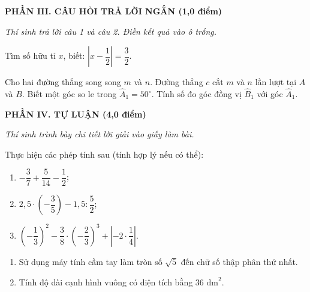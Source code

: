 \documentclass[12pt,a4paper]{article}
\begin{document}
\setcounter{ex}{0}
\noindent\textbf{\large PHẦN III. CÂU HỎI TRẢ LỜI NGẮN (1,0 điểm)}

\textit{Thí sinh trả lời câu 1 và câu 2. Điền kết quả vào ô trống.}

\vspace{1mm}
\begin{ex}
Tìm số hữu tỉ $x$, biết: $\left|x - \dfrac{1}{2}\right| = \dfrac{3}{2}$. 
\end{ex}

\begin{ex}
Cho hai đường thẳng song song $m$ và $n$. Đường thẳng $c$ cắt $m$ và $n$ lần lượt tại $A$ và $B$. Biết một góc so le trong $\widehat{A}_1 = 50^\circ$. Tính số đo góc đồng vị $\widehat{B}_1$ với góc $\widehat{A}_1$. 
\end{ex}


\newpage
\setcounter{ex}{0}
\noindent\textbf{\large PHẦN IV. TỰ LUẬN (4,0 điểm)}

\textit{Thí sinh trình bày chi tiết lời giải vào giấy làm bài.}

\vspace{1mm}
\begin{ex}
Thực hiện các phép tính sau (tính hợp lý nếu có thể):
\begin{enumerate}[label=\textbf{\alph*)}, leftmargin=0.8cm, itemsep=1pt]
\item $-\dfrac{3}{7} + \dfrac{5}{14} - \dfrac{1}{2}$;
\item $2{,}5 \cdot \left(-\dfrac{3}{5}\right) - 1{,}5 : \dfrac{5}{2}$;
\item $\left(-\dfrac{1}{3}\right)^2 - \dfrac{3}{8} \cdot \left(-\dfrac{2}{3}\right)^3 + \left|-2 \cdot \dfrac{1}{4}\right|$.
\end{enumerate}
\end{ex}
\vspace{1.5mm}

\begin{ex}

\begin{enumerate}[label=\textbf{\alph*)}, leftmargin=0.8cm, itemsep=1pt]
\item Sử dụng máy tính cầm tay làm tròn số $\sqrt{5}$ đến chữ số thập phân thứ nhất.
\item Tính độ dài cạnh hình vuông có diện tích bằng $36\text{ dm}^2$.
\end{enumerate}
\end{ex}
\vspace{1.5mm}
\end{document}
